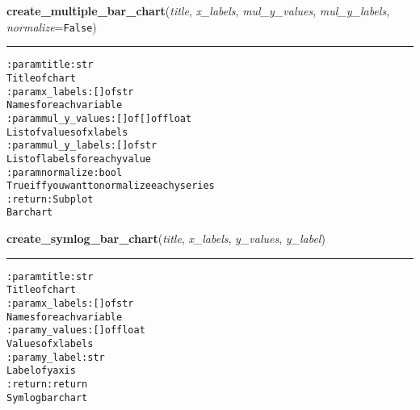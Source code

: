     \label{hal:charts:bar:create_multiple_bar_chart}

    \vspace{0.5ex}

\hspace{.8\funcindent}\begin{boxedminipage}{\funcwidth}

    \raggedright \textbf{create\_multiple\_bar\_chart}(\textit{title}, \textit{x\_labels}, \textit{mul\_y\_values}, \textit{mul\_y\_labels}, \textit{normalize}={\tt False})

    \vspace{-1.5ex}

    \rule{\textwidth}{0.5\fboxrule}
\setlength{\parskip}{2ex}
\begin{alltt}

:param title: str
    Title of chart
:param x\_labels: [] of str
    Names for each variable
:param mul\_y\_values: [] of [] of float
    List of values of x labels
:param mul\_y\_labels: [] of str
    List of labels for each y value
:param normalize: bool
    True iff you want to normalize each y series
:return: Subplot
    Bar chart
\end{alltt}

\setlength{\parskip}{1ex}
    \end{boxedminipage}

    \label{hal:charts:bar:create_symlog_bar_chart}

    \vspace{0.5ex}

\hspace{.8\funcindent}\begin{boxedminipage}{\funcwidth}

    \raggedright \textbf{create\_symlog\_bar\_chart}(\textit{title}, \textit{x\_labels}, \textit{y\_values}, \textit{y\_label})

    \vspace{-1.5ex}

    \rule{\textwidth}{0.5\fboxrule}
\setlength{\parskip}{2ex}
\begin{alltt}

:param title: str
    Title of chart
:param x\_labels: [] of str
    Names for each variable
:param y\_values: [] of float
    Values of x labels
:param y\_label: str
    Label of y axis
:return: return
    Symlog bar chart
\end{alltt}

\setlength{\parskip}{1ex}
    \end{boxedminipage}

